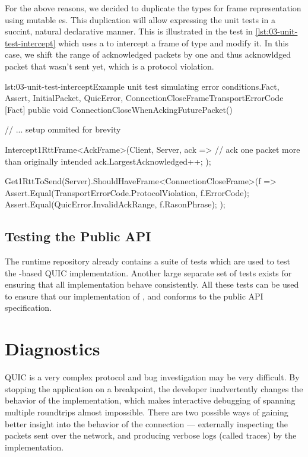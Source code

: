 For the above reasons, we decided to duplicate the types for frame representation using mutable
es. This duplication will allow expressing the unit tests in a succint, natural
declarative manner. This is illustrated in the test in \autoref{lst:03-unit-test-intercept} which
uses a  to intercept a frame of type  and
modify it. In this case, we shift the range of acknowledged packets by one and thus acknowldged
packet that wasn't sent yet, which is a protocol violation.

\begin{myListing}{lst:03-unit-test-intercept}{Example unit test simulating error conditions.}{Fact, Assert, InitialPacket, QuicError, ConnectionCloseFrame}{TransportErrorCode}
    [Fact]
    public void ConnectionCloseWhenAckingFuturePacket()
    {
        // ... setup ommited for brevity

        Intercept1RttFrame<AckFrame>(Client, Server, ack =>
        {
            // ack one packet more than originally intended
            ack.LargestAcknowledged++;
        });

        Get1RttToSend(Server).ShouldHaveFrame<ConnectionCloseFrame>(f =>
        {
            Assert.Equal(TransportErrorCode.ProtocolViolation, f.ErrorCode);
            Assert.Equal(QuicError.InvalidAckRange, f.RasonPhrase);
        });
    }
\end{myListing}

\subsection{Testing the Public API}

The \dotnet{} runtime repository already contains a suite of tests which are used to test the
\libmsquic{}-based QUIC implementation. Another large separate set of tests exists for ensuring that
all  implementation behave consistently. All these tests can be used to ensure that
our implementation of \QuicListener{}, \QuicConnection{} and \QuicStream{} conforms to the public
API specification.

\section{Diagnostics}

QUIC is a very complex protocol and bug investigation may be very difficult. By stopping the
application on a breakpoint, the developer inadvertently changes the behavior of the implementation,
which makes interactive debugging of spanning multiple roundtrips almost impossible. There are two
possible ways of gaining better insight into the behavior of the connection --- externally inspecting
the packets sent over the network, and producing verbose logs (called traces) by the implementation.

